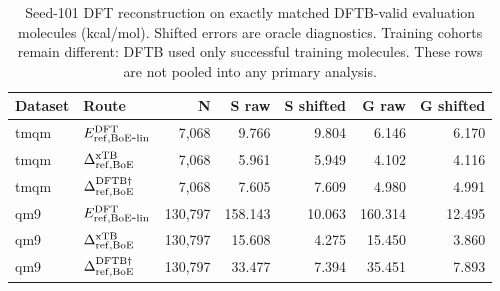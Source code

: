 \begin{table}[H]
\centering
\scriptsize
\setlength{\tabcolsep}{4pt}
\renewcommand{\arraystretch}{1.35}
\caption{Seed-101 DFT reconstruction on exactly matched DFTB-valid evaluation molecules (kcal/mol). Shifted errors are oracle diagnostics. Training cohorts remain different: DFTB used only successful training molecules. These rows are not pooled into any primary analysis.}
\begin{tabular}{llrrrrr}
\toprule
Dataset & Route & N & S raw & S shifted & G raw & G shifted \\
\midrule
tmqm & \(E_{\rm ref,BoE\mbox{-}lin}^{\rm DFT}\) & 7,068 & 9.766 & 9.804 & 6.146 & 6.170 \\
tmqm & \(\Delta^{\rm xTB}_{\rm ref,BoE}\) & 7,068 & 5.961 & 5.949 & 4.102 & 4.116 \\
tmqm & \(\Delta^{\rm DFTB\dagger}_{\rm ref,BoE}\) & 7,068 & 7.605 & 7.609 & 4.980 & 4.991 \\
qm9 & \(E_{\rm ref,BoE\mbox{-}lin}^{\rm DFT}\) & 130,797 & 158.143 & 10.063 & 160.314 & 12.495 \\
qm9 & \(\Delta^{\rm xTB}_{\rm ref,BoE}\) & 130,797 & 15.608 & 4.275 & 15.450 & 3.860 \\
qm9 & \(\Delta^{\rm DFTB\dagger}_{\rm ref,BoE}\) & 130,797 & 33.477 & 7.394 & 35.451 & 7.893 \\
\bottomrule
\end{tabular}
\end{table}
